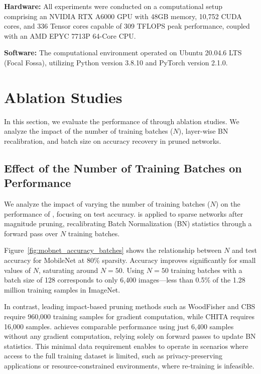 \textbf{Hardware:}  
All experiments were conducted on a computational setup comprising an NVIDIA RTX A6000 GPU with 48GB memory, 10,752 CUDA cores, and 336 Tensor cores capable of 309 TFLOPS peak performance, coupled with an AMD EPYC 7713P 64-Core CPU.

\textbf{Software:}  
The computational environment operated on Ubuntu 20.04.6 LTS (Focal Fossa), utilizing Python version 3.8.10 and PyTorch version 2.1.0.






\section{Ablation Studies}\label{sec:appendix}
In this section, we evaluate the performance of \REFLOW{} through ablation studies. We analyze the impact of the number of training batches (\(N\)), layer-wise BN recalibration, and batch size on accuracy recovery in pruned networks.


\subsection{Effect of the Number of Training Batches on Performance}\label{sec:Ablation_batches}

We analyze the impact of varying the number of training batches (\(N\)) on the performance of \REFLOW{}, focusing on test accuracy. \REFLOW{} is applied to sparse networks after magnitude pruning, recalibrating Batch Normalization (BN) statistics through a forward pass over \(N\) training batches. 

Figure~\ref{fig:mobnet_accuracy_batches} shows the relationship between \(N\) and test accuracy for MobileNet at 80\% sparsity. Accuracy improves significantly for small values of \(N\), saturating around \(N = 50\). Using \(N = 50\) training batches with a batch size of 128 corresponds to only 6,400 images—less than 0.5\% of the 1.28 million training samples in ImageNet.

In contrast, leading impact-based pruning methods such as WoodFisher \cite{WoodFisher} and CBS \cite{CBS} require 960,000 training samples for gradient computation, while CHITA \cite{CHITA} requires 16,000 samples. \REFLOW{} achieves comparable performance using just 6,400 samples without any gradient computation, relying solely on forward passes to update BN statistics. This minimal data requirement enables \REFLOW{} to operate in scenarios where access to the full training dataset is limited, such as privacy-preserving applications or resource-constrained environments, where re-training is infeasible.




